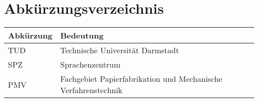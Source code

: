 \chapter*{Abkürzungsverzeichnis}
\begin{spacing}{1.5}
\setlength\LTleft{15pt}
\setlength\LTright{\fill}
\begin{longtable}{ll}
    \textbf{Abkürzung}	&\textbf{Bedeutung}	\\\midrule\endhead
    TUD	&Technische Universität Darmstadt	\\
    SPZ &Sprachenzentrum	\\
    PMV &Fachgebiet Papierfabrikation und Mechanische Verfahrenstechnik	\\
\end{longtable}
\end{spacing}

                    
